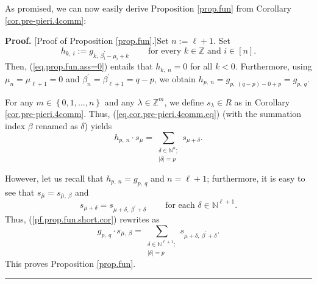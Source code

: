 \documentclass
[numbers=enddot,12pt,final,onecolumn,notitlepage,english]{scrartcl}%
\theoremstyle{definition}
\newenvironment{proof}[1][Proof]{\noindent\textbf{#1.} }{\ \rule{0.5em}{0.5em}}
\let\sumnonlimits\sum
\renewcommand{\sum}{\sumnonlimits\limits}
\newenvironment{vershort}{}{}
\begin{document}
As promised, we can now easily derive Proposition \ref{prop.fun} from
Corollary \ref{cor.pre-pieri.4comm}:

\begin{vershort}
\begin{proof}
[Proof of Proposition \ref{prop.fun}.]Set $n:=\ell+1$. Set%
\[
h_{k,\ i}:=g_{k,\ \beta_{i}^{\prime}-\mu_{i}+k}\ \ \ \ \ \ \ \ \ \ \text{for
every }k\in\mathbb{Z}\text{ and }i\in\left[  n\right]  .
\]
Then, (\ref{eq.prop.fun.ass=0}) entails that $h_{k,\ n}=0$ for all $k<0$.
Furthermore, using $\mu_{n}=\mu_{\ell+1}=0$ and $\beta_{n}^{\prime}%
=\beta_{\ell+1}^{\prime}=q-p$, we obtain $h_{p,\ n}=g_{p,\ \left(  q-p\right)
-0+p}=g_{p,\ q}$.

For any $m\in\left\{  0,1,\ldots,n\right\}  $ and any $\lambda\in
\mathbb{Z}^{m}$, we define $s_{\lambda}\in R$ as in Corollary
\ref{cor.pre-pieri.4comm}. Thus, (\ref{eq.cor.pre-pieri.4comm.eq}) (with the
summation index $\beta$ renamed as $\delta$) yields%
\begin{equation}
h_{p,\ n}\cdot s_{\overline{\mu}}=\sum_{\substack{\delta\in\mathbb{N}%
^{n};\\\left\vert \delta\right\vert =p}}s_{\mu+\delta}.
\label{pf.prop.fun.short.cor}%
\end{equation}


However, let us recall that $h_{p,\ n}=g_{p,\ q}$ and $n=\ell+1$; furthermore,
it is easy to see that $s_{\overline{\mu}}=s_{\overline{\mu},\ \beta}$ and%
\[
s_{\mu+\delta}=s_{\mu+\delta,\ \beta^{\prime}+\delta}%
\ \ \ \ \ \ \ \ \ \ \text{for each }\delta\in\mathbb{N}^{\ell+1}.
\]
Thus, (\ref{pf.prop.fun.short.cor}) rewrites as
\[
g_{p,\ q}\cdot s_{\overline{\mu},\ \beta}=\sum_{\substack{\delta\in
\mathbb{N}^{\ell+1};\\\left\vert \delta\right\vert =p}}s_{\mu+\delta
,\ \beta^{\prime}+\delta}.
\]
This proves Proposition \ref{prop.fun}.
\end{proof}
\end{vershort}
\end{document}
